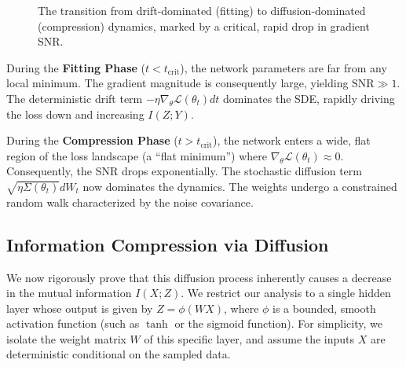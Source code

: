 \begin{figure}[htbp]
    \centering
    \caption{The transition from drift-dominated (fitting) to diffusion-dominated (compression) dynamics, marked by a critical, rapid drop in gradient SNR.}
    \label{fig:snr_drop}
\end{figure}

During the \textbf{Fitting Phase} ($t < t_{\text{crit}}$), the network parameters are far from any local minimum. The gradient magnitude is consequently large, yielding $\text{SNR} \gg 1$. The deterministic drift term $-\eta \nabla_\theta \mathcal{L}(\theta_t) dt$ dominates the SDE, rapidly driving the loss down and increasing $I(Z; Y)$.

During the \textbf{Compression Phase} ($t > t_{\text{crit}}$), the network enters a wide, flat region of the loss landscape (a ``flat minimum'') where $\nabla_\theta \mathcal{L}(\theta_t) \approx 0$. Consequently, the SNR drops exponentially. The stochastic diffusion term $\sqrt{\eta \Sigma(\theta_t)} dW_t$ now dominates the dynamics. The weights undergo a constrained random walk characterized by the noise covariance.

\subsection{Information Compression via Diffusion}

We now rigorously prove that this diffusion process inherently causes a decrease in the mutual information $I(X; Z)$. We restrict our analysis to a single hidden layer whose output is given by $Z = \phi(W X)$, where $\phi$ is a bounded, smooth activation function (such as $\tanh$ or the sigmoid function). For simplicity, we isolate the weight matrix $W$ of this specific layer, and assume the inputs $X$ are deterministic conditional on the sampled data.

